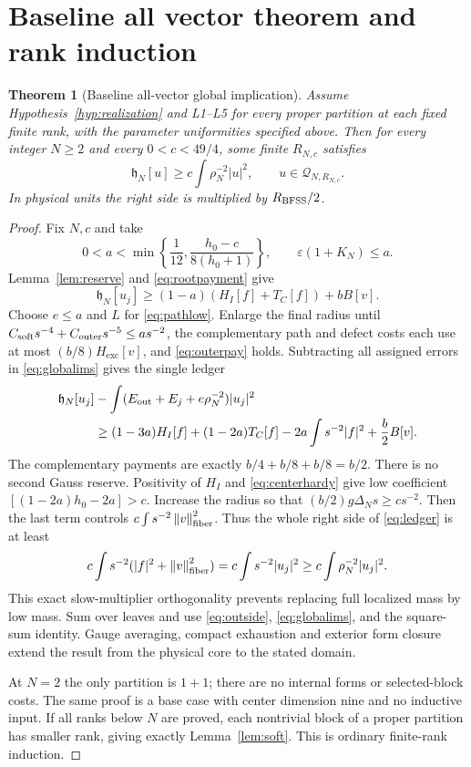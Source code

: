 \documentclass[11pt,letterpaper]{article}
\newtheorem{theorem}{Theorem}[section]
\theoremstyle{definition}\newtheorem{hypothesis}[theorem]{Hypothesis}
\newcommand{\exc}{\mathrm{exc}}
\newcommand{\hh}{\mathfrak h}
\newcommand{\QQ}{\mathcal Q}
\newcommand{\norm}[1]{\left\lVert #1\right\rVert}
\numberwithin{equation}{section}
\begin{document}
\section{Baseline all vector theorem and rank induction}
\begin{theorem}[Baseline all-vector global implication]\label{thm:global}
Assume Hypothesis~\ref{hyp:realization} and L1--L5 for every proper partition at each fixed finite rank, with the parameter uniformities specified above. Then for every integer $N\ge2$ and every $0<c<49/4$, some finite $R_{N,c}$ satisfies
\begin{equation}
 \hh_N[u]\ge c\int\rho_N^{-2}|u|^2,\qquad u\in\QQ_{N,R_{N,c}}.\label{eq:main}
\end{equation}
In physical units the right side is multiplied by $R_{\rm BFSS}/2$.
\end{theorem}
\begin{proof}
Fix $N,c$ and take
\begin{equation}
 0<a<\min\left\{\frac1{12},\frac{h_0-c}{8(h_0+1)}\right\},
 \qquad\varepsilon(1+K_N)\le a.
\end{equation}
Lemma~\ref{lem:reserve} and \eqref{eq:rootpayment} give
\begin{equation}
 \hh_N[u_j]\ge(1-a)(H_I[f]+T_C[f])+bB[v].
\end{equation}
Choose $e\le a$ and $L$ for \eqref{eq:pathlow}. Enlarge the final radius until
$C_{\rm soft}s^{-4}+C_{\rm outer}s^{-5}\le as^{-2}$,
the complementary path and defect costs each use at most $(b/8)H_{\exc}[v]$, and \eqref{eq:outerpay} holds. Subtracting all assigned errors in \eqref{eq:globalims} gives the single ledger
\begin{align}
 \hh_N[u_j]&-\int(E_{\rm out}+E_j+e\rho_N^{-2})|u_j|^2\nonumber\\
 &\ge(1-3a)H_I[f]+(1-2a)T_C[f]
          -2a\int s^{-2}|f|^2+\frac b2B[v].\label{eq:ledger}
\end{align}
The complementary payments are exactly $b/4+b/8+b/8=b/2$. There is no second Gauss reserve. Positivity of $H_I$ and \eqref{eq:centerhardy} give low coefficient
$[(1-2a)h_0-2a]>c$.
Increase the radius so that $(b/2)g\Delta_Ns\ge cs^{-2}$. Then the last term controls $c\int s^{-2}\norm{v}_{\rm fiber}^2$. Thus the whole right side of \eqref{eq:ledger} is at least
\begin{equation}
 c\int s^{-2}(|f|^2+\norm{v}_{\rm fiber}^2)
 =c\int s^{-2}|u_j|^2\ge c\int\rho_N^{-2}|u_j|^2.
\end{equation}
This exact slow-multiplier orthogonality prevents replacing full localized mass by low mass. Sum over leaves and use \eqref{eq:outside}, \eqref{eq:globalims}, and the square-sum identity. Gauge averaging, compact exhaustion and exterior form closure extend the result from the physical core to the stated domain.

At $N=2$ the only partition is $1+1$; there are no internal forms or selected-block costs. The same proof is a base case with center dimension nine and no inductive input. If all ranks below $N$ are proved, each nontrivial block of a proper partition has smaller rank, giving exactly Lemma~\ref{lem:soft}. This is ordinary finite-rank induction.
\end{proof}
\end{document}
